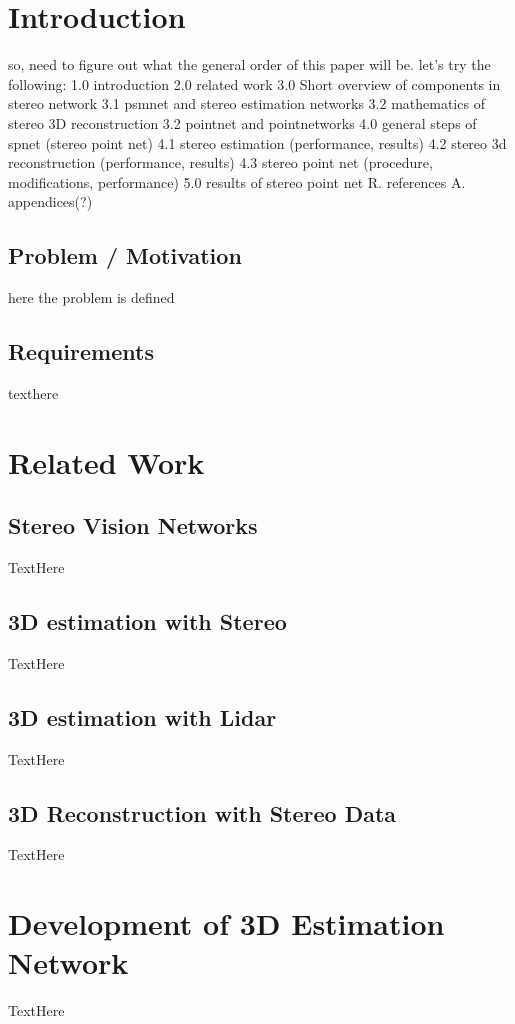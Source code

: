 \section{Introduction}
so, need to figure out what the general order of this paper will be. let's try the following: 
1.0 introduction
2.0 related work
3.0 Short overview of components in stereo network
  3.1 psmnet and stereo estimation networks
  3.2 mathematics of stereo 3D reconstruction
  3.2 pointnet and pointnetworks
4.0 general steps of spnet (stereo point net)
  4.1 stereo estimation (performance, results)
  4.2 stereo 3d reconstruction (performance, results)
  4.3 stereo point net (procedure, modifications, performance)
5.0 results of stereo point net
R. references
A. appendices(?)

\subsection{Problem / Motivation}
here the problem is defined
\subsection{Requirements}
texthere

\section{Related Work}
\subsection{Stereo Vision Networks}
TextHere

\subsection{3D estimation with Stereo}
TextHere

\subsection{3D estimation with Lidar}
TextHere

\subsection{3D Reconstruction with Stereo Data}
TextHere

\section{Development of 3D Estimation Network}
TextHere

